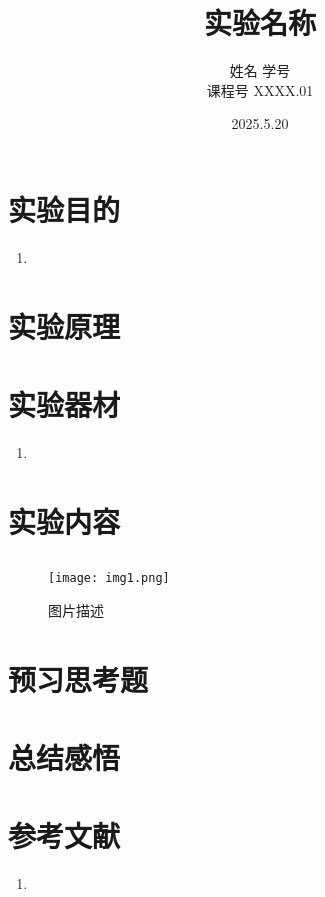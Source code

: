 \documentclass{article}
\title{\heiti\zihao{2}实验名称 }
\author{\songti  姓名  学号 \\
课程号  XXXX.01 }
\date{2025.5.20}
\begin{document}
    \maketitle
\begin{abstract}
    
\end{abstract}
\section{实验目的}
\begin{enumerate}
    \item 
\end{enumerate}

\section{实验原理}

\section{实验器材}
\label{sec:equipment}
    \begin{enumerate}
        \item 
    \end{enumerate} 

\section{实验内容}
\subsection{ }

\begin{figure}[H]
    \centering
    \texttt{[image: img1.png]}
    \caption{图片描述}
    \label{fig:star_connection_circuit}
\end{figure}





\section{预习思考题 }
\subsection{ }
\subsection{ }


\subsection{ }




\section{总结感悟 }

\section{参考文献}
\begin{enumerate}
    \item 
\end{enumerate} 
\end{document}
